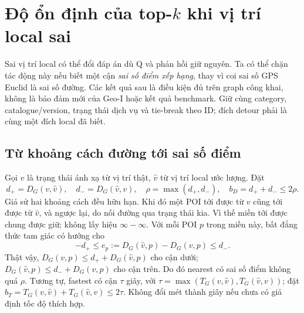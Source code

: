 \section{Độ ổn định của top-$k$ khi vị trí local sai}
\label{sec:formal-ranking-robustness}

Sai vị trí local có thể đổi đáp án dù Q và phản hồi giữ nguyên. Ta có thể
chặn tác động này nếu biết một cận \emph{sai số điểm xếp hạng}, thay vì
coi sai số GPS Euclid là sai số đường. Các kết quả sau là điều kiện đủ
trên graph công khai, không là bảo đảm mới của Geo-I hoặc kết quả
benchmark. Giữ cùng category, catalogue/version, trạng thái dịch vụ và
tie-break theo ID; đích detour phải là cùng một đích local đã biết.

\subsection{Từ khoảng cách đường tới sai số điểm}
\label{sec:formal-ranking-score-error}

Gọi $v$ là trạng thái ánh xạ từ vị trí thật, $\hat v$ từ vị trí local ước
lượng. Đặt
\begin{equation}
 d_+=D_G(v,\hat v),\quad d_-=D_G(\hat v,v),\quad
 \rho=\max(d_+,d_-),\quad b_D=d_++d_-\leq2\rho.
 \label{eq:formal-ranking-road-error}
\end{equation}
Giả sử hai khoảng cách đều hữu hạn. Khi đó một POI tới được từ $v$ cũng
tới được từ $\hat v$, và ngược lại, do nối đường qua trạng thái kia.
Vì thế miền tới được chung được giữ; không lấy hiệu $\infty-\infty$.
Với mỗi POI $p$ trong miền này, bất đẳng thức tam giác có hướng cho
\begin{equation}
 -d_+\leq e_p:=D_G(\hat v,p)-D_G(v,p)\leq d_-.
 \label{eq:formal-ranking-directed-interval}
\end{equation}
Thật vậy, $D_G(v,p)\leq d_++D_G(\hat v,p)$ cho cận dưới;
$D_G(\hat v,p)\leq d_-+D_G(v,p)$ cho cận trên. Do đó nearest có sai
số điểm không quá $\rho$. Tương tự, fastest có cận $\tau$ giây, với
$\tau=\max(T_G(v,\hat v),T_G(\hat v,v))$; đặt
$b_T=T_G(v,\hat v)+T_G(\hat v,v)\leq2\tau$. Không đổi mét thành giây
nếu chưa có giả định tốc độ thích hợp.

